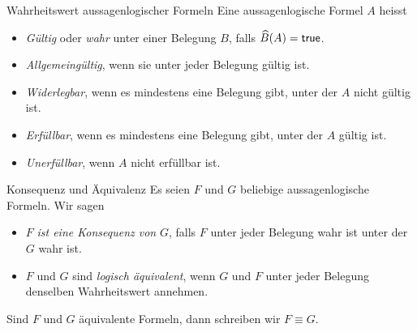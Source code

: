 \begin{definition}{Wahrheitswert aussagenlogischer Formeln}
    Eine aussagenlogische Formel $A$ heisst
    \begin{itemize}
        \item \textit{Gültig} oder \textit{wahr} unter einer Belegung $B$, falls $\widehat{B}(A)=\mathsf{true}$.
        \item \textit{Allgemeingültig}, wenn sie unter jeder Belegung gültig ist.
        \item \textit{Widerlegbar}, wenn es mindestens eine Belegung gibt, unter der $A$ nicht gültig ist.
        \item \textit{Erfüllbar}, wenn es mindestens eine Belegung gibt, unter der $A$ gültig ist.
        \item \textit{Unerfüllbar}, wenn $A$ nicht erfüllbar ist.
    \end{itemize}
\end{definition}


\begin{comment}
\begin{remark}
    Eines der grössten ungelösten Probleme der (theoretischen) Informatik ist die Frage,
    ob es einen ``effizienten'' Algorithmus gibt, der von jeder aussagenlogischen Formel
    entscheidet, ob sie erfüllbar ist oder nicht. Diese Problemstellung wird mit $\mathsf{SAT}$ (von
    engl. \textbf{sat}isfiability) bezeichnet. Die Relevanz dieser Frage kommt daher, dass sich das
    $\mathsf{P}\stackrel{?}{=}\mathsf{NP}$ Problem (die Frage, ob zwei der wichtigsten Komplexitätsklassen übereinstimmen) darauf reduzieren lässt.
\end{remark}
\end{comment}



\begin{definition}{Konsequenz und Äquivalenz}
    Es seien $F$ und $G$ beliebige aussagenlogische Formeln. Wir sagen
    \begin{itemize}
        \item $F$ \textit{ist eine Konsequenz von }$G$, falls $F$ unter jeder Belegung wahr ist unter der $G$ wahr ist.
        \item $F$ und $G$ sind \textit{logisch äquivalent}, wenn $G$ und $F$ unter jeder Belegung denselben Wahrheitswert annehmen.
    \end{itemize}
    Sind $F$ und $G$ äquivalente Formeln, dann schreiben wir $F\equiv G$.
\end{definition}

